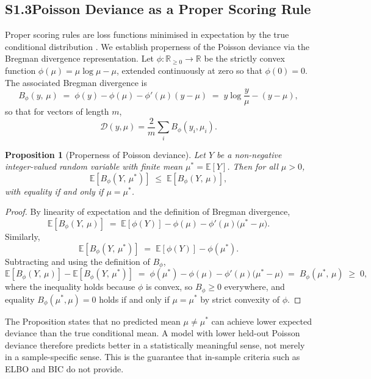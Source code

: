 \documentclass[11pt]{article}
\newtheorem{proposition}{Proposition}
\begin{document}
\subsection*{S1.3\quad Poisson Deviance as a Proper Scoring Rule}

Proper scoring rules are loss functions minimised in expectation by the true conditional distribution \citep{Gneiting2007ProperScoring}.
We establish properness of the Poisson deviance via the Bregman divergence representation.
Let $\phi: \mathbb{R}_{\geq 0} \to \mathbb{R}$ be the strictly convex function $\phi(\mu) = \mu \log \mu - \mu$, extended continuously at zero so that $\phi(0)=0$.
The associated Bregman divergence is
\[
  B_{\phi}(y,\,\mu)
  \;=\;
  \phi(y) - \phi(\mu) - \phi'(\mu)(y - \mu)
  \;=\;
  y \log\frac{y}{\mu} - (y - \mu),
\]
so that for vectors of length $m$,
\[
  \mathcal{D}(y,\mu) = \frac{2}{m} \sum_i B_\phi(y_i, \mu_i).
\]

\begin{proposition}[Properness of Poisson deviance]
Let $Y$ be a non-negative integer-valued random variable with finite mean $\mu^* = \mathbb{E}[Y]$.
Then for all $\mu > 0$,
\[
  \mathbb{E}\!\left[B_\phi(Y,\,\mu^*)\right]
  \;\leq\;
  \mathbb{E}\!\left[B_\phi(Y,\,\mu)\right],
\]
with equality if and only if $\mu = \mu^*$.
\end{proposition}

\begin{proof}
By linearity of expectation and the definition of Bregman divergence,
\[
  \mathbb{E}\!\left[B_\phi(Y,\,\mu)\right]
  \;=\;
  \mathbb{E}[\phi(Y)] - \phi(\mu) - \phi'(\mu)\bigl(\mu^* - \mu\bigr).
\]
Similarly,
\[
  \mathbb{E}\!\left[B_\phi(Y,\,\mu^*)\right]
  \;=\;
  \mathbb{E}[\phi(Y)] - \phi(\mu^*).
\]
Subtracting and using the definition of $B_\phi$,
\[
  \mathbb{E}\!\left[B_\phi(Y,\,\mu)\right]
  - \mathbb{E}\!\left[B_\phi(Y,\,\mu^*)\right]
  \;=\;
  \phi(\mu^*) - \phi(\mu) - \phi'(\mu)\bigl(\mu^* - \mu\bigr)
  \;=\;
  B_\phi(\mu^*,\,\mu)
  \;\geq\; 0,
\]
where the inequality holds because $\phi$ is convex, so $B_\phi \geq 0$ everywhere, and equality $B_\phi(\mu^*, \mu) = 0$ holds if and only if $\mu = \mu^*$ by strict convexity of $\phi$.
\end{proof}

\noindent The Proposition states that no predicted mean $\mu \neq \mu^*$ can achieve lower expected deviance than the true conditional mean.
A model with lower held-out Poisson deviance therefore predicts better in a statistically meaningful sense, not merely in a sample-specific sense.
This is the guarantee that in-sample criteria such as ELBO and BIC do not provide.
\end{document}
